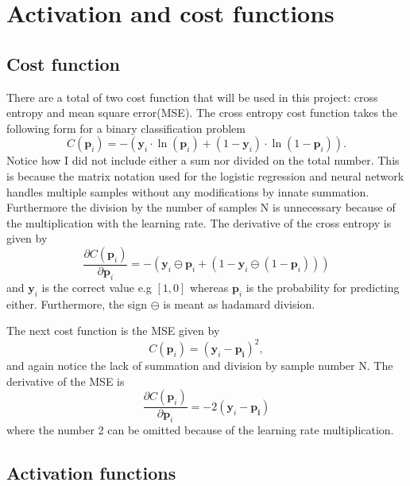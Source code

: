\documentclass[uio,jmp,amsmath,amssymb,reprint,nofootinbib]{revtex4-1}
\numberwithin{equation}{section}
\newcommand{\lp}{\left(}
\newcommand{\rp}{\right)}
\begin{document}
\section{Activation and cost functions}

\subsection{Cost function}

There are a total of two cost function that will be used in this project: cross entropy and mean square error(MSE). The cross entropy cost function takes the following form for a binary classification problem
\begin{equation}
C(\bm{p}_i) = -\lp \bm{y}_i\cdot \ln(\bm{p}_i) + (1-\bm{y}_i)\cdot \ln(1-\bm{p}_i)\rp.
\end{equation}
Notice how I did not include either a sum nor divided on the total number. This is because the matrix notation used for the logistic regression and neural network handles multiple samples without any modifications by innate summation. Furthermore the division by the number of samples N is unnecessary because of the multiplication with the learning rate. The derivative of the cross entropy is given by
\begin{equation}
\frac{\partial C(\bm{p}_i)}{\partial \bm{p}_i} = -\lp \bm{y}_i\ominus\bm{p}_i + \lp 1 - \bm{y}_i\ominus (1-\bm{p}_i)\rp\rp
\end{equation}
and \(\bm{y}_i\) is the correct value e.g \([1,0]\) whereas \(\bm{p}_i\) is the probability for predicting either. Furthermore, the sign \(\ominus\) is meant as hadamard division.

The next cost function is the MSE given by
\begin{equation}
C(\bm{p}_i) = \lp \bm{y}_i - \bm{p_i}\rp^2,
\end{equation}
and again notice the lack of summation and division by sample number N. The derivative of the MSE is
\begin{equation}
\frac{\partial C(\bm{p}_i)}{\partial \bm{p}_i} = -2\lp \bm{y}_i - \bm{p_i}\rp
\end{equation}
where the number 2 can be omitted because of the learning rate multiplication.

\subsection{Activation functions}\label{sec:activation}
\end{document}
